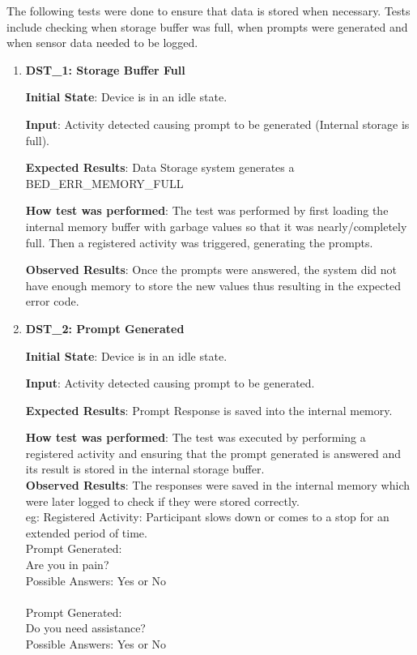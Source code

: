 \documentclass[12pt, titlepage]{article}
\begin{document}
The following tests were done to ensure that data is stored when necessary. Tests include checking when storage buffer was full, when prompts were generated and when sensor data needed to be logged.
\begin{enumerate}
  \item{\textbf{DST\_1: Storage Buffer Full} \\}\label{DST1}

  \textbf{Initial State}: Device is in an idle state.

  \textbf{Input}: Activity detected causing prompt to be generated (Internal storage is full).

  \textbf{Expected Results}: Data Storage system generates a BED\_ERR\_MEMORY\_FULL

  \textbf{How test was performed}: The test was performed by first loading the internal memory buffer with garbage values so that it was nearly/completely full. Then a registered activity was triggered, generating the prompts.

  \textbf{Observed Results}:  Once the prompts were answered, the system did not have enough memory to store the new values thus resulting in the expected error code.


  \item{\textbf{DST\_2: Prompt Generated} \\}\label{DST2}

  \textbf{Initial State}: Device is in an idle state.

  \textbf{Input}: Activity detected causing prompt to be generated.

  \textbf{Expected Results}: Prompt Response is saved into the internal memory.

  \textbf{How test was performed}: The test was executed by performing a registered activity and ensuring that the prompt generated is answered and its result is stored in the internal storage buffer.\\

  \textbf{Observed Results}: The responses were saved in the internal memory which were later logged to check if they were stored correctly.\\
  eg: Registered Activity: Participant slows down or comes to a stop for an extended period of time.\\
  Prompt Generated: \\
  Are you in pain?\\
  Possible Answers: Yes or No\\
  \\
  Prompt Generated: \\
  Do you need assistance?\\
  Possible Answers: Yes or No\\


\end{enumerate}
\end{document}
